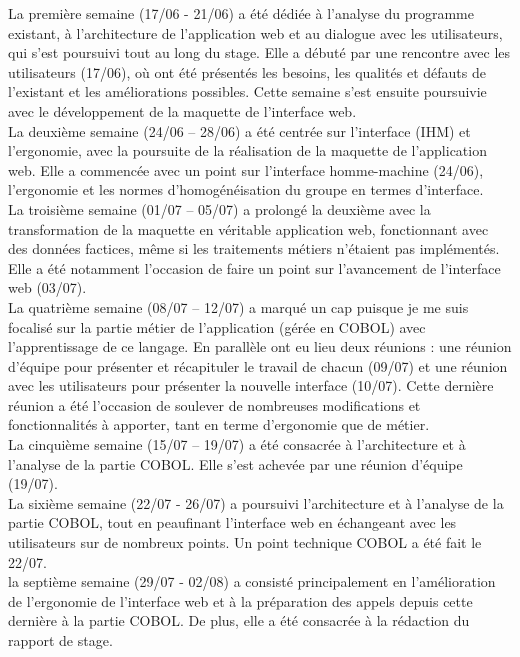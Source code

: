 \documentclass[a4paper,french,12pt]{article}
\begin{document}
		La première semaine (17/06 - 21/06) a été dédiée à l’analyse du programme existant, à l’architecture de l’application web et au dialogue avec les utilisateurs,
		qui s’est poursuivi tout au long du stage. Elle a débuté par une rencontre avec les utilisateurs (17/06), où ont été présentés les besoins, les qualités et défauts de l’existant et les améliorations possibles. 
		Cette semaine s’est ensuite poursuivie avec le développement de la maquette de l'interface web. \\ 
		
		La deuxième semaine (24/06 – 28/06) a été centrée sur l’interface (IHM) et l’ergonomie, avec la poursuite de la réalisation de la maquette de l’application web.
		Elle a commencée avec un point sur l’interface homme-machine (24/06), l’ergonomie et les normes d’homogénéisation du groupe en termes d’interface.\\ 
		
		La troisième semaine (01/07 – 05/07) a prolongé la deuxième avec la transformation de la maquette en véritable application web, fonctionnant avec des données factices, 
		même si les traitements métiers n'étaient pas implémentés.
		Elle a été notamment l’occasion de faire un point sur l’avancement de l’interface web (03/07).\\ 

		La quatrième semaine (08/07 – 12/07) a marqué un cap puisque je me suis focalisé sur la partie métier de l’application (gérée en COBOL) avec l’apprentissage de ce langage. 
		En parallèle ont eu lieu deux réunions : une réunion d’équipe pour présenter et récapituler le travail de chacun (09/07) et une réunion avec les utilisateurs pour présenter la nouvelle interface (10/07). 
		Cette dernière réunion a été l’occasion de soulever de nombreuses modifications et fonctionnalités à apporter, tant en terme d’ergonomie que de métier.\\

		La cinquième semaine (15/07 – 19/07) a été consacrée à l’architecture et à l’analyse de la partie COBOL. Elle s’est achevée par une réunion d’équipe (19/07). \\ 
		
		La sixième semaine (22/07 - 26/07) a poursuivi l’architecture et à l’analyse de la partie COBOL, tout en peaufinant l'interface web en échangeant avec les utilisateurs sur de nombreux points.
		Un point technique COBOL a été fait le 22/07.\\ 
		
		la septième semaine (29/07 - 02/08) a consisté principalement en l'amélioration de l'ergonomie de l'interface web et à la préparation des appels depuis cette dernière à la partie COBOL. De plus,
		elle a été consacrée à la rédaction du rapport de stage.
		\\ 
		
\end{document}
